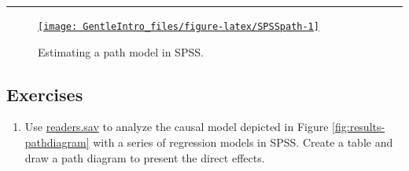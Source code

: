 \documentclass[a4paper]{book}
\providecommand{\tightlist}{%
  \setlength{\itemsep}{0pt}\setlength{\parskip}{0pt}}
\theoremstyle{definition}
\theoremstyle{definition}
\theoremstyle{definition}
\theoremstyle{remark}
\begin{document}
\begin{center}\rule{0.5\linewidth}{\linethickness}\end{center}

\begin{figure}[H]
\href{https://www.youtube.com/embed/SsurWx_SGKI}{\texttt{[image: GentleIntro\_files/figure-latex/SPSSpath-1]} }\caption{Estimating a path model in SPSS.}\label{fig:SPSSpath}
\end{figure}

\subsection{Exercises}\label{exercises-11}

\begin{enumerate}
\def\labelenumi{\arabic{enumi}.}
\tightlist
\item
  Use \href{http://82.196.4.233:3838/data/readers.sav}{readers.sav} to
  analyze the causal model depicted in Figure
  \ref{fig:results-pathdiagram} with a series of regression models in
  SPSS. Create a table and draw a path diagram to present the direct
  effects.
\end{enumerate}
\end{document}
